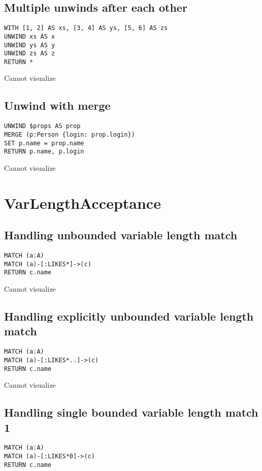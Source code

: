 \subsection{Multiple unwinds after each other}

\begin{lstlisting}
WITH [1, 2] AS xs, [3, 4] AS ys, [5, 6] AS zs
UNWIND xs AS x
UNWIND ys AS y
UNWIND zs AS z
RETURN *
\end{lstlisting}

Cannot visualize
\subsection{Unwind with merge}

\begin{lstlisting}
UNWIND $props AS prop
MERGE (p:Person {login: prop.login})
SET p.name = prop.name
RETURN p.name, p.login
\end{lstlisting}

Cannot visualize
\section{VarLengthAcceptance}

\subsection{Handling unbounded variable length match}

\begin{lstlisting}
MATCH (a:A)
MATCH (a)-[:LIKES*]->(c)
RETURN c.name
\end{lstlisting}

Cannot visualize
\subsection{Handling explicitly unbounded variable length match}

\begin{lstlisting}
MATCH (a:A)
MATCH (a)-[:LIKES*..]->(c)
RETURN c.name
\end{lstlisting}

Cannot visualize
\subsection{Handling single bounded variable length match 1}

\begin{lstlisting}
MATCH (a:A)
MATCH (a)-[:LIKES*0]->(c)
RETURN c.name
\end{lstlisting}

